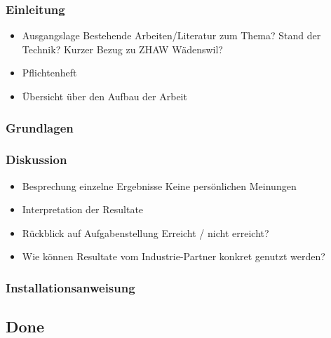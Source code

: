 \documentclass[../main.tex]{subfiles}
\begin{document}
	\subsubsection{Einleitung}
	\begin{itemize}
		\item Ausgangslage
		\subitem Bestehende Arbeiten/Literatur zum Thema?
		\subitem Stand der Technik?
		\subitem Kurzer Bezug zu ZHAW Wädenswil?
		
		\item Pflichtenheft
		\item Übersicht über den Aufbau  der Arbeit
	\end{itemize}
	
	\subsubsection{Grundlagen}
	
	\subsubsection{Diskussion}
	\begin{itemize}
		\item Besprechung einzelne Ergebnisse
		\subitem Keine persönlichen Meinungen
		
		\item Interpretation der Resultate
		
		\item Rückblick auf Aufgabenstellung
		\subitem Erreicht / nicht erreicht?
		
		\item Wie können Resultate vom Industrie-Partner konkret genutzt werden?
	\end{itemize}
	
	\subsubsection{Installationsanweisung}
	\subsection{Done}

	

	

	

	
\end{document}
